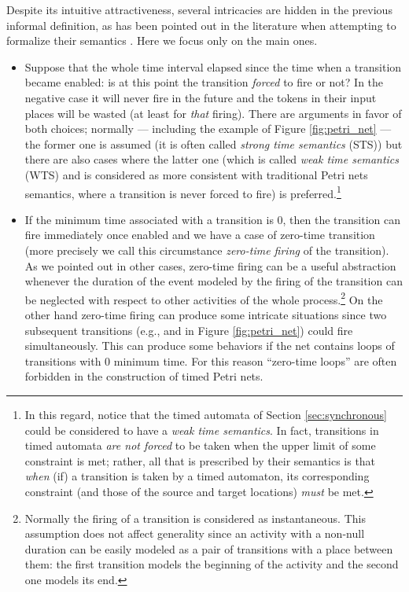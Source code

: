 Despite its intuitive attractiveness, several intricacies are 
hidden in the previous informal definition, as has been pointed 
out in the literature when attempting to formalize their semantics \cite{FMM94,GMMP91}. 
Here we focus only on the main ones.

\begin{itemize}
\item Suppose that the whole time interval elapsed since the time when 
a transition became enabled: is at this point the transition \emph{forced} 
to fire or not? In the negative case it will never fire in the 
future and the tokens in their input places will be wasted (at 
least for \emph{that} firing). There are arguments in favor of both 
choices; normally --- including the example of Figure \ref{fig:petri_net} --- the 
former one is assumed (it is often called \emph{strong time semantics} 
(STS)) but there are also cases where the latter one (which is 
called \emph{weak time semantics} (WTS) and is considered as more 
consistent with traditional Petri nets semantics, where a transition 
is never forced to fire) is preferred.\footnote{In this regard, notice that the timed automata of Section \ref{sec:synchronous} could be considered to have a \emph{weak time semantics}. In fact, transitions in timed automata \emph{are not forced} to be taken when the upper limit of some constraint is met; rather, all that is prescribed by their semantics is that \emph{when} (if) a transition is taken by a timed automaton, its corresponding constraint (and those of the source and target locations) \emph{must} be met.}

\item If the minimum time associated with a transition is 0, then the
  transition can fire immediately once enabled and we have a case of
  zero-time transition (more precisely we call this circumstance
  \emph{zero-time firing} of the transition). As we pointed out in
  other cases, zero-time firing can be a useful abstraction whenever
  the duration of the event modeled by the firing of the transition
  can be neglected with respect to other activities of the whole
  process.\footnote{Normally the firing of a transition is considered
    as instantaneous. This assumption does not affect generality since
    an activity with a non-null duration can be easily modeled as a
    pair of transitions with a place between them: the first
    transition models the beginning of the activity and the second one
    models its end.}  On the other hand zero-time firing can produce
  some intricate situations since two subsequent transitions (e.g.,
   and  in Figure \ref{fig:petri_net}) could fire
  simultaneously. This can produce some  behaviors if the net
  contains loops of transitions with 0 minimum time. For this reason
  ``zero-time loops'' are often forbidden in the construction of timed
  Petri nets.
\end{itemize}

